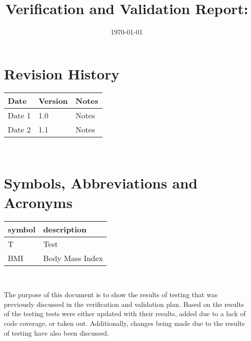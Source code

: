 \documentclass[12pt, titlepage]{article}
\begin{document}
	
	\title{Verification and Validation Report: \progname} 
	\author{\authname}
	\date{\today}
	
	\maketitle
	
	
	\section{Revision History}
	
	\begin{tabularx}{\textwidth}{p{3cm}p{2cm}X}
		\toprule {\bf Date} & {\bf Version} & {\bf Notes}\\
		\midrule
		Date 1 & 1.0 & Notes\\
		Date 2 & 1.1 & Notes\\
		\bottomrule
	\end{tabularx}
	
	~\newpage
	
	\section{Symbols, Abbreviations and Acronyms}
	
	\renewcommand{\arraystretch}{1.2}
	\begin{tabular}{l l} 
		\toprule		
		\textbf{symbol} & \textbf{description}\\
		\midrule 
		T & Test\\
		BMI & Body Mass Index\\
		\bottomrule
	\end{tabular}\\
	
	
	\newpage
	
	\tableofcontents
	
	\listoftables %
	
	\listoffigures %
	
	\newpage
	
	
	The purpose of this document is to show the results of testing that was previously discussed in the verification and validation plan. Based on the results of the testing tests were either updated with their results, added due to a lack of code coverage, or taken out. Additionally, changes being made due to the results of testing have also been discussed. 
	
\end{document}

